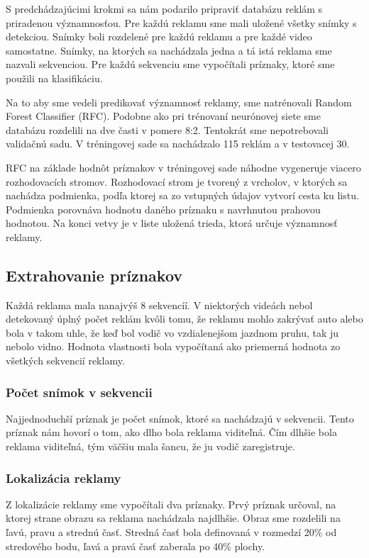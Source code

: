 S predchádzajúcimi krokmi sa nám podarilo pripraviť databázu reklám s priradenou významnosťou. Pre každú reklamu sme mali uložené všetky snímky s detekciou. Snímky boli rozdelené pre každú reklamu a pre každé video samostatne. Snímky, na ktorých sa nachádzala jedna a tá istá reklama sme nazvali sekvenciou. Pre každú sekvenciu sme vypočítali príznaky, ktoré sme použili na klasifikáciu.

Na to aby sme vedeli predikovať významnosť reklamy, sme natrénovali Random Forest Classifier (RFC). Podobne ako pri trénovaní neurónovej siete sme databázu rozdelili na dve časti v pomere 8:2. Tentokrát sme nepotrebovali validačnú sadu. V tréningovej sade sa nachádzalo 115 reklám a v testovacej 30.

RFC na základe hodnôt príznakov v tréningovej sade náhodne vygeneruje viacero rozhodovacích stromov. Rozhodovací strom je tvorený z vrcholov, v ktorých sa nachádza podmienka, podľa ktorej sa zo vstupných údajov vytvorí cesta ku listu. Podmienka porovnáva hodnotu daného príznaku s navrhnutou prahovou hodnotou. Na konci vetvy je v liste uložená trieda, ktorá určuje významnosť reklamy.

\subsection{Extrahovanie príznakov}

Každá reklama mala nanajvýš 8 sekvencíí. V niektorých videách nebol detekovaný úplný počet reklám kvôli tomu, že reklamu mohlo zakrývať auto alebo bola v takom uhle, že keď bol vodič vo vzdialenejšom jazdnom pruhu, tak ju nebolo vidno. Hodnota vlastnosti bola vypočítaná ako priemerná hodnota zo všetkých sekvencií reklamy.

\subsubsection{Počet snímok v sekvencii}

Najjednoduchší príznak je počet snímok, ktoré sa nachádzajú v sekvencii. Tento príznak nám hovorí o tom, ako dlho bola reklama viditeľná. Čím dlhšie bola reklama viditeľná, tým väčšiu mala šancu, že ju vodič zaregistruje.

\subsubsection{Lokalizácia reklamy}

Z lokalizácie reklamy sme vypočítali dva príznaky. Prvý príznak určoval, na ktorej strane obrazu sa reklama nachádzala najdlhšie. Obraz sme rozdelili na ľavú, pravu a strednú časť. Stredná časť bola definovaná v rozmedzí 20\% od stredového bodu, ľavá a pravá časť zaberala po 40\% plochy.


